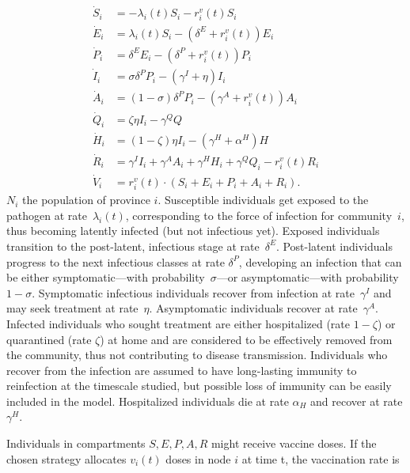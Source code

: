 \begin{equation}\label{eq:sepiar}
\begin{split}
    \dot{S}_i &= - \lambda_i(t) S_i - r^v_i(t) S_i \\
    \dot{E}_i &= \lambda_i(t) S_i -  (\delta^E + r^v_i(t)) E_i \\
    \dot{P}_i &= \delta^E E_i -  (\delta^P+r^v_i(t))  P_i \\
    \dot{I}_i &= \sigma \delta^P P_i - (\gamma^I + \eta)  I_i \\
    \dot{A}_i &= (1 - \sigma) \delta^P P_i - (\gamma^A+ r^v_i(t)) A_i \\
    \dot{Q}_i &= \zeta \eta I_i - \gamma^Q Q \\
    \dot{H}_i &= (1-\zeta) \eta I_i - (\gamma^H + \alpha^H)H \\
    \dot{R}_i &= \gamma^I I_i + \gamma^A A_i + \gamma^H H_i + \gamma^Q Q_i - r^v_i(t) R_i\\
    \dot{V}_i &= r^v_i(t) \cdot (S_i + E_i + P_i + A_i + R_i).
\end{split}
\end{equation}
$N_i$ the population of province $i$. Susceptible individuals get exposed to the pathogen at rate~$\lambda_i(t)$, corresponding to the force of infection for community~$i$, thus becoming latently infected (but not infectious yet). Exposed individuals transition to the post-latent, infectious stage at rate~$\delta^E$. Post-latent individuals progress to the next infectious classes at rate $\delta^P$, developing an infection that can be either symptomatic---with probability~$\sigma$---or asymptomatic---with probability $1 - \sigma$. Symptomatic infectious individuals recover from infection at rate~$\gamma^I$ and may seek treatment at rate~$\eta$. Asymptomatic individuals recover at rate~$\gamma^A$.  Infected individuals who sought treatment are either hospitalized (rate $1-\zeta$) or quarantined (rate $\zeta$) at home and are considered to be effectively removed from the community, thus not contributing to disease transmission. Individuals who recover from the infection are assumed to have long-lasting immunity to reinfection at the timescale studied, but possible loss of immunity can be easily included in the model. Hospitalized individuals die at rate $\alpha_H$ and recover at rate $\gamma^H$.

Individuals in compartments $S, E, P, A, R$ might receive vaccine doses. If the chosen strategy allocates $v_{i}(t)$ doses in node $i$ at time t, the vaccination rate is

